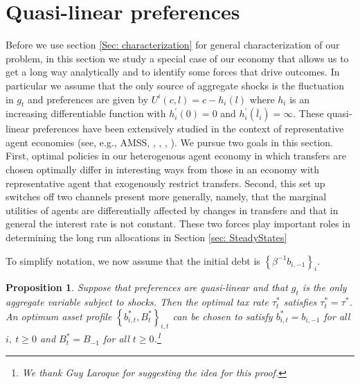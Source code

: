 \documentclass[thmsb,11pt]{article}
\newtheorem{proposition}{Proposition}
\begin{document}
\section{Quasi-linear preferences}\label{Sec: quasilinear}
Before we use section \ref{Sec: characterization}  for general characterization of our problem, in this section we study a special case of our economy that allows us to get a long way analytically and to identify some forces that drive outcomes. In particular we assume that the only source of aggregate shocks is the fluctuation in $g_t$ and preferences are given by $U^{i}\left( c,l\right) =c-h_{i}(l)$ where $h_{i}$ is an increasing differentiable function with $h_{i}^{\prime
}\left( 0\right) =0$ and $h_{i}^{\prime }\left( \bar{l}_{i}\right) =\infty $. These quasi-linear preferences have been extensively studied in the context of representative agent economies (see, e.g.,  AMSS, \cite{Farhi2010}, \cite{Battaglini2007,Battaglini2008}, \cite{Yared2010}, \cite{Faraglia2011}). We pursue two goals in this section. First, optimal policies in our heterogenous agent  economy in which transfers are chosen optimally
 differ in interesting ways from those
 in an economy with representative agent that exogenously restrict  transfers. Second, this set up switches off two channels  present more generally, namely, that the marginal utilities of agents are differentially affected by changes in transfers and that in general the interest rate  is not constant. These two forces  play  important roles in determining the long run allocations in Section \ref{sec: SteadyStates}

To simplify notation, we now assume that the initial debt is $%
\left\{ \beta ^{-1}b_{i,-1}\right\} _{i}.$

\begin{proposition}
\label{Prop: quasilinear} Suppose that preferences are quasi-linear and that  $g_t$ is the only aggregate variable subject to  shocks. Then the optimal tax rate $\tau
_{t}^{\ast }$ satisfies $\tau _{t}^{\ast }=\tau ^{\ast }$. An optimum asset
profile $\left \{ b_{i,t}^{\ast },B_{t}^{\ast }\right \} _{i,t}$ can be
chosen to satisfy $b_{i,t}^{\ast }=b_{i,-1}$ for all $i,\ t\geq 0$ and $%
B_{t}^{\ast }=B_{-1}$ for all $t\geq 0$.\footnote{%
We thank Guy Laroque for suggesting the idea for this proof.}
\end{proposition}
\end{document}
